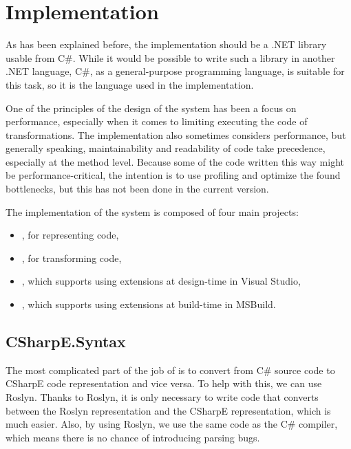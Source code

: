 \chapter{Implementation}

As has been explained before, the implementation should be a .NET library usable from C\#. While it would be possible to write such a library in another .NET language, C\#, as a general-purpose programming language, is suitable for this task, so it is the language used in the implementation.

One of the principles of the design of the system has been a focus on performance, especially when it comes to limiting executing the code of transformations. The implementation also sometimes considers performance, but generally speaking, maintainability and readability of code take precedence, especially at the method level. Because some of the code written this way might be performance-critical, the intention is to use profiling and optimize the found bottlenecks, but this has not been done in the current version.

\medskip

The implementation of the system is composed of four main projects:

\begin{itemize}
\item {}, for representing code,
\item {}, for transforming code,
\item {}, which supports using extensions at design-time in Visual Studio,
\item {}, which supports using extensions at build-time in MSBuild.
\end{itemize}

\section{CSharpE.Syntax}

The most complicated part of the job of  is to convert from C\# source code to CSharpE code representation and vice versa. To help with this, we can use Roslyn. Thanks to Roslyn, it is only necessary to write code that converts between the Roslyn representation and the CSharpE representation, which is much easier. Also, by using Roslyn, we use the same code as the C\# compiler, which means there is no chance of introducing parsing bugs.

